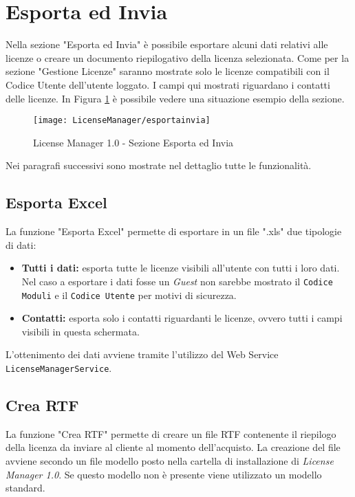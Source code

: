 
\section{Esporta ed Invia}

Nella sezione "Esporta ed Invia" è possibile esportare alcuni dati relativi alle licenze o creare un documento riepilogativo della licenza selezionata. Come per la sezione "Gestione Licenze" saranno mostrate solo le licenze compatibili con il Codice Utente dell’utente loggato. I campi qui mostrati riguardano i contatti delle licenze.
In Figura \ref{espinv} è possibile vedere una situazione esempio della sezione.

\begin{figure}[!h] 
    \centering 
    \texttt{[image: LicenseManager/esportainvia]} 
    \caption{License Manager 1.0 - Sezione Esporta ed Invia}
\label{espinv}
\end{figure}

Nei paragrafi successivi sono mostrate nel dettaglio tutte le funzionalità. 

\subsection{Esporta Excel}

La funzione "Esporta Excel" permette di esportare in un file ".xls" due tipologie di dati:
\begin{itemize}

\item \textbf{Tutti i dati:} esporta tutte le licenze visibili all’utente con tutti i loro dati. Nel caso a esportare i dati fosse un \textit{Guest} non sarebbe mostrato il \texttt{Codice Moduli} e il \texttt{Codice Utente} per motivi di sicurezza.
\item \textbf{Contatti:} esporta solo i contatti riguardanti le licenze, ovvero tutti i campi visibili in questa schermata.

\end{itemize}

L'ottenimento dei dati avviene tramite l'utilizzo del Web Service \texttt{LicenseManagerService}.

\subsection{Crea RTF}
\label{creartf}
La funzione "Crea RTF" permette di creare un file RTF contenente il riepilogo della licenza da inviare al cliente al momento dell’acquisto. La creazione del file avviene secondo un file modello posto nella cartella di installazione di \textit{License Manager 1.0}. Se questo modello non è presente viene utilizzato un modello standard.

